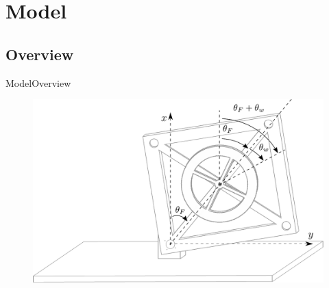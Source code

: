 \section{Model}
\subsection{Overview}
\begin{frame}{Model}{Overview}
	\begin{figure}[H]
		\centering
		\includegraphics[scale=0.5]{Pictures/mechanicalSystem.pdf}
	\end{figure}
\end{frame}

